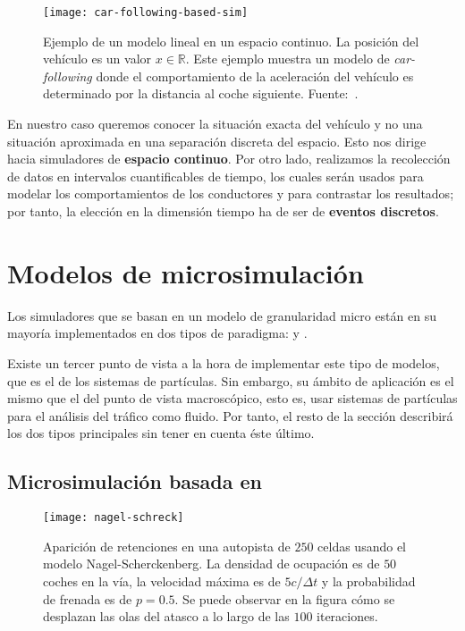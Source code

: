 \begin{figure*}[t]
	\centering
	\texttt{[image: car-following-based-sim]}
	\caption[Ejemplo de modelo lineal en un espacio continuo]{Ejemplo de un modelo lineal en un espacio continuo. La posición del vehículo es un valor $x \in \mathbb{R}$. Este ejemplo muestra un modelo de \textit{car-following} donde el comportamiento de la aceleración del vehículo es determinado por la distancia al coche siguiente. Fuente:~\cite{Tordeux2011}.}
	\label{fig:car-following-based-sim}
\end{figure*}

En nuestro caso queremos conocer la situación exacta del vehículo y no una situación aproximada en una separación discreta del espacio. Esto nos dirige hacia simuladores de \textbf{espacio continuo}. Por otro lado, realizamos la recolección de datos en intervalos cuantificables de tiempo, los cuales serán usados para modelar los comportamientos de los conductores y para contrastar los resultados; por tanto, la elección en la dimensión tiempo ha de ser de \textbf{eventos discretos}.

\section{Modelos de microsimulación}

Los simuladores que se basan en un modelo de granularidad micro están en su mayoría implementados en dos tipos de paradigma:  y .

Existe un tercer punto de vista a la hora de implementar este tipo de modelos, que es el de los sistemas de partículas. Sin embargo, su ámbito de aplicación es el mismo que el del punto de vista macroscópico, esto es, usar sistemas de partículas para el análisis del tráfico como fluido. Por tanto, el resto de la sección describirá los dos tipos principales sin tener en cuenta éste último.

\subsection{Microsimulación basada en }

\begin{figure}[t]
	\centering
	\texttt{[image: nagel-schreck]}
	\caption[Ejemplo de efecto de ondas de choque en simulación de tipo Nagel-Scherckenberg]{Aparición de retenciones en una autopista de $250$ celdas usando el modelo Nagel-Scherckenberg. La densidad de ocupación es de $50$ coches en la vía, la velocidad máxima es de $5 c/\Delta t$ y la probabilidad de frenada es de $p = 0.5$. Se puede observar en la figura cómo se desplazan las olas del atasco a lo largo de las $100$ iteraciones.}
	\label{fig:nagel-schreck}
\end{figure}

